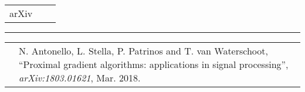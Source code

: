 \documentclass[10pt,A4]{article}
\newcommand{\tzlarrow}{(0,0) -- (0.2,0) -- (0.3,0.2) -- (0.2,0.4) -- (0,0.4) -- (0.1,0.2) -- cycle;}
\newcommand{\larrow}[1]
{\begin{tikzpicture}[scale=0.58]
	 \filldraw[fill=#1!100,draw=#1!100!black]  \tzlarrow
 \end{tikzpicture}
}
\newcommand{\cvsection}[1]
{
\colorbox{sectcol}{\mystrut \makebox[1\linewidth][l]{
\larrow{bgcol} \hspace{-8pt} \larrow{bgcol} \hspace{-8pt} \larrow{bgcol} \textcolor{mycolor6}{\textbf{#1}}\hspace{4pt}
}}\\
}
\newcommand{\cveventnone}[3]
{
\vspace{8pt}
	\begin{tabular*}{1\textwidth}{p{5.3cm}  p{4.8cm} x{6.9cm}}
 \textcolor{bgcol}{#1}& \textbf{#2} & \vspace{2.5pt}\textcolor{sectcol}{#3}

	\end{tabular*}
	\vspace{-12pt}
\textcolor{softcol}{\hrule}
}
\newcommand{\mystrut}{\rule[-.3\baselineskip]{0pt}{\baselineskip}}
\begin{document}
\cveventnone{arXiv}{}{ }
\vspace{6pt}

	\begin{tabular*}{1\textwidth}{p{0.3cm} p{16.4cm}}
&		 \larrow{bgcol}  N. Antonello, L. Stella, P. Patrinos and T. van Waterschoot, ``Proximal gradient algorithms: applications in signal processing'', {\em arXiv:1803.01621}, Mar. 2018.\\[3pt]

	\end{tabular*}


\vspace{7pt}


\newpage



%
%
%
\end{document}
